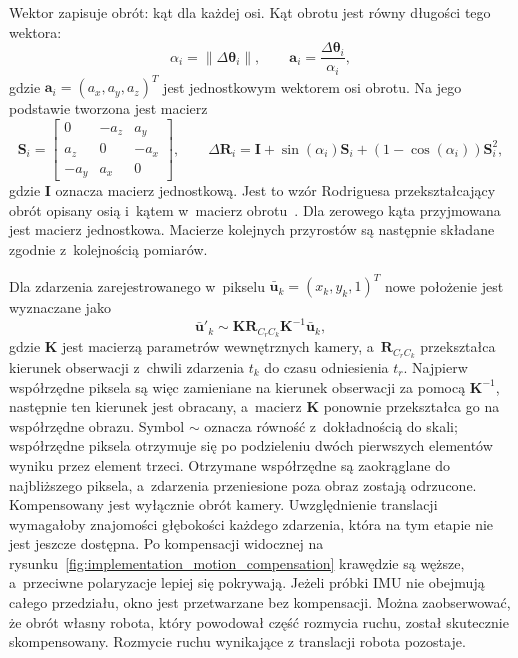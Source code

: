 Wektor zapisuje obrót: kąt dla każdej osi. Kąt obrotu jest równy długości tego wektora:
\begin{equation}
    \alpha_i=\left\|\Delta\boldsymbol{\theta}_i\right\|,
    \qquad
    \mathbf{a}_i=\frac{\Delta\boldsymbol{\theta}_i}{\alpha_i},
    \label{eq:implementation_axis_angle}
\end{equation}
gdzie $\mathbf{a}_i=(a_x,a_y,a_z)^T$ jest jednostkowym wektorem osi obrotu. Na jego podstawie tworzona jest macierz
\begin{equation}
    \mathbf{S}_i=
    \begin{bmatrix}
        0 & -a_z & a_y\\
        a_z & 0 & -a_x\\
        -a_y & a_x & 0
    \end{bmatrix},
    \qquad
    \Delta\mathbf{R}_i=
    \mathbf{I}+\sin(\alpha_i)\mathbf{S}_i+
    \left(1-\cos(\alpha_i)\right)\mathbf{S}_i^2,
    \label{eq:implementation_rodrigues}
\end{equation}
gdzie $\mathbf{I}$ oznacza macierz jednostkową. Jest to wzór Rodriguesa przekształcający obrót opisany osią i~kątem w~macierz obrotu~\cite{blanco2021se3}. Dla zerowego kąta przyjmowana jest macierz jednostkowa. Macierze kolejnych przyrostów są następnie składane zgodnie z~kolejnością pomiarów.

Dla zdarzenia zarejestrowanego w~pikselu $\bar{\mathbf{u}}_k=(x_k,y_k,1)^T$ nowe położenie jest wyznaczane jako
\begin{equation}
    \bar{\mathbf{u}}'_k\sim
    \mathbf{K}\mathbf{R}_{C_r C_k}\mathbf{K}^{-1}\bar{\mathbf{u}}_k,
    \label{eq:implementation_motion_compensation}
\end{equation}
gdzie $\mathbf{K}$ jest macierzą parametrów wewnętrznych kamery, a~$\mathbf{R}_{C_r C_k}$ przekształca kierunek obserwacji z~chwili zdarzenia $t_k$ do czasu odniesienia $t_r$. Najpierw współrzędne piksela są więc zamieniane na kierunek obserwacji za pomocą $\mathbf{K}^{-1}$, następnie ten kierunek jest obracany, a~macierz $\mathbf{K}$ ponownie przekształca go na współrzędne obrazu. Symbol $\sim$ oznacza równość z~dokładnością do skali; współrzędne piksela otrzymuje się po podzieleniu dwóch pierwszych elementów wyniku przez element trzeci.
Otrzymane współrzędne są zaokrąglane do najbliższego piksela, a~zdarzenia przeniesione poza obraz zostają odrzucone. Kompensowany jest wyłącznie obrót kamery. Uwzględnienie translacji wymagałoby znajomości głębokości każdego zdarzenia, która na tym etapie nie jest jeszcze dostępna.
Po kompensacji widocznej na rysunku~\ref{fig:implementation_motion_compensation} krawędzie są węższe, a~przeciwne polaryzacje lepiej się pokrywają. Jeżeli próbki IMU nie obejmują całego przedziału, okno jest przetwarzane bez kompensacji. Można zaobserwować, że obrót własny robota, który powodował część rozmycia ruchu, został skutecznie skompensowany. Rozmycie ruchu wynikające z translacji robota pozostaje.

